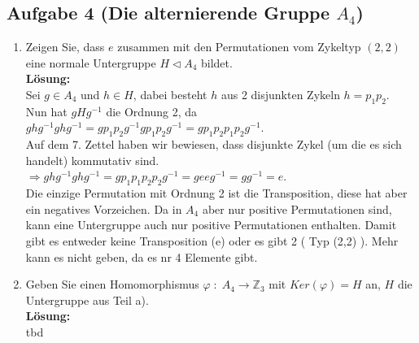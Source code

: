 \documentclass[11pt,a4paper,ngerman]{article}
\begin{document}
\subsection*{Aufgabe 4 \mdseries (Die alternierende Gruppe $A_4$)}

\begin{enumerate}[\bfseries a)]
\item Zeigen Sie, dass $e$ zusammen mit den Permutationen vom Zykeltyp $(2,2)$ eine normale Untergruppe $H \vartriangleleft A_4$ bildet.\\

\textbf{Lösung:}\\

Sei $g \in A_4$ und $h \in H$, dabei besteht $h$ aus 2 disjunkten Zykeln $h = p_1p_2$.\\

Nun hat $gHg^{-1}$ die Ordnung 2, da\\
$ghg^{-1}ghg^{-1} = gp_1p_2g^{-1}gp_1p_2g^{-1} = g p_1 p_2 p_1 p_2 g^{-1}$.\\
Auf dem 7. Zettel haben wir bewiesen, dass disjunkte Zykel (um die es sich handelt) kommutativ sind.\\

$\Rightarrow ghg^{-1}ghg^{-1} = g p_1 p_1 p_2 p_2 g^{-1} = g e e g^{-1} = g g^{-1} = e$.\\

Die einzige Permutation mit Ordnung 2 ist die Transposition, diese hat aber ein negatives Vorzeichen. Da in $A_4$ aber nur positive Permutationen sind, kann eine Untergruppe auch nur positive Permutationen enthalten. Damit gibt es entweder keine Transposition (e) oder es gibt 2 ( Typ (2,2) ). Mehr kann es nicht geben, da es nr 4 Elemente gibt.

\item Geben Sie einen Homomorphismus $\varphi \; : \; A_4 \rightarrow \mathbb{Z}_3$ mit $Ker(\varphi ) = H$ an, $H$ die Untergruppe aus Teil a).\\

\textbf{Lösung:}\\

tbd

\end{enumerate}

\label{LastPage}
\end{document}
